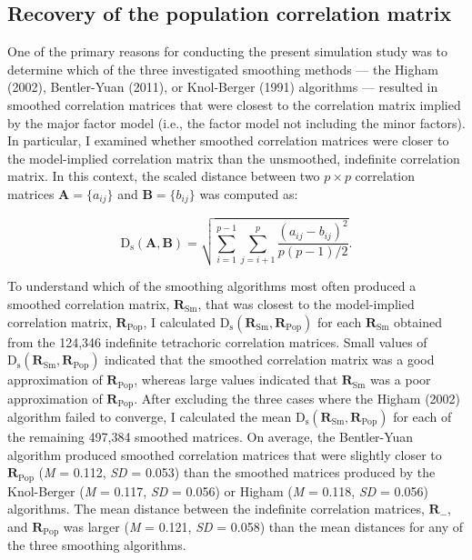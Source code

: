 \documentclass[
  english,
  man]{apa6}
\begin{document}
\hypertarget{recovery-of-the-population-correlation-matrix}{%
\subsection{Recovery of the population correlation matrix}\label{recovery-of-the-population-correlation-matrix}}

One of the primary reasons for conducting the present simulation study was to determine which of the three investigated smoothing methods --- the Higham (2002), Bentler-Yuan (2011), or Knol-Berger (1991) algorithms --- resulted in smoothed correlation matrices that were closest to the correlation matrix implied by the major factor model (i.e., the factor model not including the minor factors). In particular, I examined whether smoothed correlation matrices were closer to the model-implied correlation matrix than the unsmoothed, indefinite correlation matrix. In this context, the scaled distance between two \(p \times p\) correlation matrices \(\mathbf{A} = \{a_{ij}\}\) and \(\mathbf{B} = \{ b_{ij} \}\) was computed as:

\begin{equation}
\mathrm{D}_{\mathrm{s}}(\mathbf{A}, \mathbf{B})=\sqrt{\sum_{i=1}^{p-1} \sum_{j=i+1}^{p} \frac{\left(a_{i j}-b_{i j}\right)^{2}}{p(p-1)/2}}.
\label{eq:scaled-distance}
\end{equation}

To understand which of the smoothing algorithms most often produced a smoothed correlation matrix, \(\mathbf{R}_{\textrm{Sm}}\), that was closest to the model-implied correlation matrix, \(\mathbf{R}_{\textrm{Pop}}\), I calculated \(\mathrm{D}_{\mathrm{s}}(\mathbf{R}_{\textrm{Sm}}, \mathbf{R}_{\textrm{Pop}})\) for each \(\mathbf{R}_{\textrm{Sm}}\) obtained from the 124,346 indefinite tetrachoric correlation matrices. Small values of \(\mathrm{D}_{\mathrm{s}}(\mathbf{R}_{\textrm{Sm}}, \mathbf{R}_{\textrm{Pop}})\) indicated that the smoothed correlation matrix was a good approximation of \(\mathbf{R}_{\textrm{Pop}}\), whereas large values indicated that \(\mathbf{R}_{\textrm{Sm}}\) was a poor approximation of \(\mathbf{R}_{\textrm{Pop}}\). After excluding the three cases where the Higham (2002) algorithm failed to converge, I calculated the mean \(\mathrm{D}_{\mathrm{s}}(\mathbf{R}_{\textrm{Sm}}, \mathbf{R}_{\textrm{Pop}})\) for each of the remaining 497,384 smoothed matrices. On average, the Bentler-Yuan algorithm produced smoothed correlation matrices that were slightly closer to \(\mathbf{R}_{\textrm{Pop}}\) (\emph{M} = 0.112, \emph{SD} = 0.053) than the smoothed matrices produced by the Knol-Berger (\emph{M} = 0.117, \emph{SD} = 0.056) or Higham (\emph{M} = 0.118, \emph{SD} = 0.056) algorithms. The mean distance between the indefinite correlation matrices, \(\mathbf{R}_{-}\), and \(\mathbf{R}_{\textrm{Pop}}\) was larger (\emph{M} = 0.121, \emph{SD} = 0.058) than the mean distances for any of the three smoothing algorithms.
\end{document}
